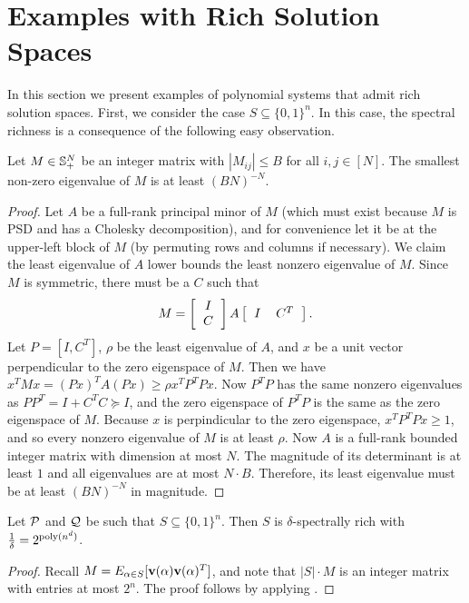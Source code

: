 \section{Examples with Rich Solution Spaces}
\label{sec:nicespaces}
In this section we present examples of polynomial systems that admit rich solution spaces. First, we consider the case $S \subseteq \{0,1\}^n$. In this case, the spectral richness is a consequence of the following easy observation.
\begin{lemma} \label{lem:integer}
	Let $M \in \mathbb{S}_+^{N}$ be an integer matrix with $|M_{ij}| \leq B$ for all $i,j \in [N]$.  The smallest non-zero eigenvalue of $M$ is at least 
	$(BN)^{-N}$.
\end{lemma}
\begin{proof}
Let $A$ be a full-rank principal minor of $M$ (which must exist because $M$ is PSD and has a Cholesky decomposition), and for convenience let it be at the upper-left block of $M$ (by permuting rows and columns if necessary). We claim the least eigenvalue of $A$ lower bounds the least nonzero eigenvalue of $M$.
%
Since $M$ is symmetric, there must be a $C$ such that
\[M = \left[\begin{tabular}{c} $I$ \\ $C$\end{tabular}\right]A\left[\begin{tabular}{cc} $I$ & $C^T$\end{tabular}\right].\]
Let $P = [I, C^T]$, $\rho$ be the least eigenvalue of $A$, and $x$ be a unit vector perpendicular to the zero eigenspace of $M$. Then we have $x^TMx = (Px)^TA(Px) \geq \rho x^TP^TPx$.
Now $P^TP$ has the same nonzero eigenvalues as $PP^T = I + C^TC \succeq I$, and the zero eigenspace of $P^TP$ is the same as the zero eigenspace of $M$. Because $x$ is perpindicular to the zero eigenspace, $x^TP^TPx \geq 1$, and so every nonzero eigenvalue of $M$ is at least $\rho$. Now $A$ is a full-rank bounded integer matrix with dimension at most $N$. The magnitude of its determinant is at least $1$ and all eigenvalues are at most $N \cdot B$.  Therefore, its least eigenvalue must be at least $(BN)^{-N}$ in magnitude. 
\end{proof}


\begin{lemma}\label{lem:integer-rich}
Let $\mathcal P$ and $\mathcal Q$ be such that $S \subseteq \{0,1\}^n$. Then $S$ is $\delta$-spectrally rich with $\frac{1}{\delta} = 2^{\operatorname{poly}(n^d)}$.
\end{lemma}
\begin{proof}
	Recall $M = E_{\alpha \in S}[{\bf v}(\alpha){\bf v}(\alpha)^T]$, and note that $|S| \cdot M$ is an integer matrix with entries at most $2^n$.  The proof follows by applying . 
\end{proof}

